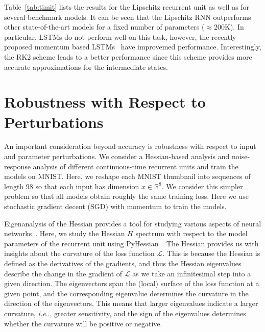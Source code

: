 \documentclass{article} \usepackage{iclr2021_conference,times}
\makeatletter
\DeclareRobustCommand\onedot{\futurelet\@let@token\@onedot}
\def\@onedot{\ifx\@let@token.\else.\null\fi\xspace}
\def\ie{\emph{i.e}\onedot} \def\Ie{\emph{I.e}\onedot}
\makeatother
\begin{document}
Table~\ref{tab:timit} lists the results for the Lipschitz recurrent unit as well as for several benchmark models. It can be seen that the Lipschitz RNN outperforms other state-of-the-art models for a fixed number of parameters ($\approx 200$K). In particular, LSTMs do not perform well on this task, however, the recently proposed momentum based LSTMs~\citep{nguyen2020momentumrnn} have improvemed performance.
Interestingly, the RK2 scheme leads to a better performance since this scheme provides more accurate approximations for the intermediate states. 




\section{Robustness with Respect to Perturbations}\label{sec:sensitivity}



An important consideration beyond accuracy is robustness with respect to input and parameter perturbations. We consider a Hessian-based analysis and noise-response analysis of different continuous-time recurrent units and train the models on MNIST. Here, we reshape each MNIST thumbnail into sequences of length $98$ so that each input has dimension $x\in \mathbb{R}^8$.
We consider this simpler problem so that all models obtain roughly the same training loss. Here we use stochastic gradient decent (SGD) with momentum to train the models.

Eigenanalysis of the Hessian provides a tool for studying various aspects of neural networks~\citep{hochreiter1997flat,sagun2017empirical,ghorbani2019investigation}.
Here, we study the Hessian $H$ spectrum with respect to the model parameters of the recurrent unit using PyHessian~\citep{YGKM19_pyhessian_TR}. 
The Hessian provides us with insights about the curvature of the loss function $\mathcal{L}$.  
This is because the Hessian is defined as the derivatives of the gradients, and thus the Hessian eigenvalues describe the change in the gradient of $\mathcal{L}$ as we take an infinitesimal step into a given direction. 
The eigenvectors span the (local) surface of the loss function at a given point, and the corresponding eigenvalue determines the curvature in the direction of the eigenvectors. 
This means that larger eigenvalues indicate a larger curvature, \ie, greater sensitivity, and the sign of the eigenvalues determines whether the curvature will be positive or negative.
\end{document}
